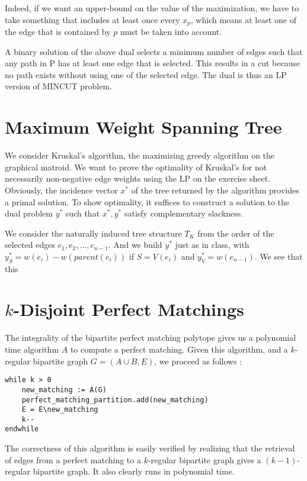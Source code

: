 \documentclass{scrartcl}
\newcommand\1{\mathbf{1}}
\begin{document}
Indeed, if we want an upper-bound on the value of the maximization, we have to take something that includes at least once every $x_p$, which means at least one of the edge that is contained by $p$ must be taken into account. 

A binary solution of the above dual selects a minimum number of edges such that any path in P has at least one edge that is selected. This results in a cut because no path exists without using one of the selected edge. The dual is thus an LP version of MINCUT problem.

\section{Maximum Weight Spanning Tree}
We consider Kruskal's algorithm, the maximizing greedy algorithm on the graphical matroid. We want to prove the optimality of Kruskal's for not necessarily non-negative edge weights using the LP on the exercise sheet. Obviously, the incidence vector $x^*$ of the tree returned by the algorithm provides a primal solution. To show optimality, it suffices to construct a solution to the dual problem $y^*$ such that $x^*,y^*$ satisfy complementary slackness.

We consider the naturally induced tree structure $T_K$ from the order of the selected edges ${e_1,e_2,...,e_{n-1}}$. And we build $y^*$ just as in class, with $y^*_S = w(e_i) - w(parent(e_i))$ if $S=V(e_i)$ and $y^*_V = w(e_{n-1})$. We see that this 

\section{$k$-Disjoint Perfect Matchings}

The integrality of the bipartite perfect matching polytope gives us a polynomial time algorithm $A$ to compute a perfect matching. Given this algorithm, and a $k$-regular bipartite graph $G = (A \cup B,E)$, we proceed as follows :

\begin{verbatim}
while k > 0
    new_matching := A(G) 
    perfect_matching_partition.add(new_matching)
    E = E\new_matching
    k--
endwhile
\end{verbatim}

The correctness of this algorithm is easily verified by realizing that the retrieval of edges from a perfect matching to a $k$-regular bipartite graph gives a $(k-1)$-regular bipartite graph. It also clearly runs in polynomial time.
\end{document}
